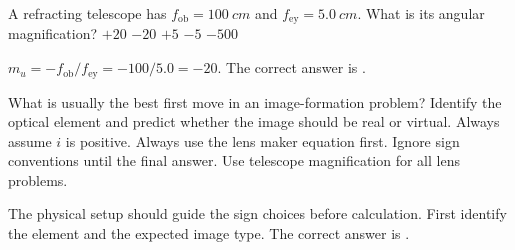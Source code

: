 \documentclass[full,print,11pt,a4paper]{physicsquiz}
\begin{document}
\begin{quizbank}
  \begin{quizquestion}[
    id=optics-telescope-019,
    topic=optical-instruments,
    difficulty=applied,
    marks=1,
    correct=B,
    tags={telescope,angular-magnification},
    outcome={Compute telescope angular magnification}
  ]
    A refracting telescope has \(f_{\text{ob}}=\SI{100}{cm}\) and
    \(f_{\text{ey}}=\SI{5.0}{cm}\). What is its angular magnification?
    \choices
      {\(+20\)}
      {\(-20\)}
      {\(+5\)}
      {\(-5\)}
      {\(-500\)}
  \end{quizquestion}
  \begin{quizsolution}
    \(m_u=-f_{\text{ob}}/f_{\text{ey}}=-100/5.0=-20\). The correct answer
    is \quizcorrectletter.
  \end{quizsolution}

  \begin{quizquestion}[
    id=optics-summary-020,
    topic=summary,
    difficulty=foundation,
    marks=1,
    correct=A,
    tags={conceptual-summary,signs},
    outcome={Choose the best general strategy for image problems}
  ]
    What is usually the best first move in an image-formation problem?
    \choices
      {Identify the optical element and predict whether the image should be real or virtual.}
      {Always assume \(i\) is positive.}
      {Always use the lens maker equation first.}
      {Ignore sign conventions until the final answer.}
      {Use telescope magnification for all lens problems.}
  \end{quizquestion}
  \begin{quizsolution}
    The physical setup should guide the sign choices before calculation. First
    identify the element and the expected image type. The correct answer is
    \quizcorrectletter.
  \end{quizsolution}
\end{quizbank}



\makequiztitle
{}
\tableofcontents
\clearpage

\printquizquestions[2]

\begin{quizanswerkeycontent}
  \clearpage
  \printquizanswerkey
\end{quizanswerkeycontent}

\begin{quizsolutioncontent}
  \clearpage
  \printquizsolutions
\end{quizsolutioncontent}

\begin{quizteachercontent}
  \clearpage
  \printquiztopicreport
  \printquizteacherreport
\end{quizteachercontent}
\end{document}
